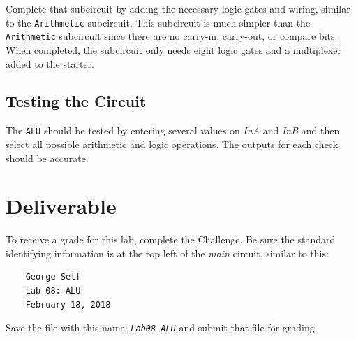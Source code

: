 Complete that subcircuit by adding the necessary logic gates and wiring, similar to the \lstinline[columns=fixed]|Arithmetic| subcircuit. This subcircuit is much simpler than the \lstinline[columns=fixed]|Arithmetic| subcircuit since there are no carry-in, carry-out, or compare bits. When completed, the subcircuit only needs eight logic gates and a multiplexer added to the starter.

\subsection{Testing the Circuit}

The \lstinline[columns=fixed]|ALU| should be tested by entering several values on \textit{InA} and \textit{InB} and then select all possible arithmetic and logic operations. The outputs for each check should be accurate.

\section{Deliverable}

To receive a grade for this lab, complete the Challenge. Be sure the standard identifying information is at the top left of the \textit{main} circuit, similar to this: 

\bigskip
\begin{minipage}{\linewidth}
	\begin{verbatim}
	George Self
	Lab 08: ALU
	February 18, 2018
	\end{verbatim}
\end{minipage}
\bigskip

Save the file with this name: \emph{\texttt{Lab08\_ALU}} and submit that file for grading.
